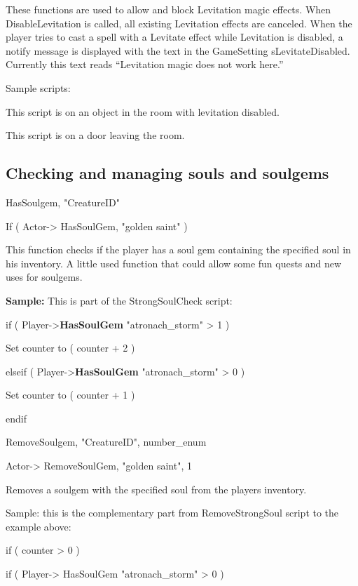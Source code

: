 These functions are used to allow and block Levitation magic effects.
When DisableLevitation is called, all existing Levitation effects are
canceled. When the player tries to cast a spell with a Levitate effect
while Levitation is disabled, a notify message is displayed with the
text in the GameSetting sLevitateDisabled. Currently this text reads
``Levitation magic does not work here.''

Sample scripts:

This script is on an object in the room with levitation disabled.



This script is on a door leaving the room.



\hypertarget{checking-and-managing-souls-and-soulgems}{%
\subsection{Checking and managing souls and
soulgems}\label{checking-and-managing-souls-and-soulgems}}

HasSoulgem, "CreatureID"

If ( Actor-> HasSoulGem, "golden saint" )

This function checks if the player has a soul gem containing the
specified soul in his inventory. A little used function that could allow
some fun quests and new uses for soulgems.

\textbf{Sample:} This is part of the StrongSoulCheck script:

if ( Player->\textbf{HasSoulGem} "atronach\_storm"
> 1 )

Set counter to ( counter + 2 )

elseif ( Player->\textbf{HasSoulGem} "atronach\_storm"
> 0 )

Set counter to ( counter + 1 )

endif

RemoveSoulgem, "CreatureID", number\_enum

Actor-> RemoveSoulGem, "golden saint", 1

Removes a soulgem with the specified soul from the players inventory.

Sample: this is the complementary part from RemoveStrongSoul script to
the example above:

if ( counter > 0 )

if ( Player-> HasSoulGem "atronach\_storm" > 0 )

